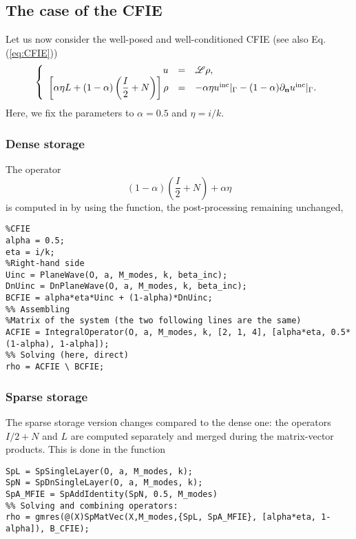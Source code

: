 \subsection{The case of the CFIE}

Let us now consider  the well-posed and well-conditioned CFIE (see also Eq. (\ref{eq:CFIE}))
$$
\left\{\begin{array}{r c l}
u &=& {\mathscr L}\rho,\\
\displaystyle \left[\alpha\eta L  + (1-\alpha)\left(\frac{I}{2}+N\right)\right]\rho &=& -\alpha\eta u^{\textrm{inc}}|_{\Gamma} - (1-\alpha) \partial_{\mathbf{n}}u^{\textrm{inc}}|_{\Gamma}.
\end{array}\right.
$$
Here, we fix the parameters  to $\alpha=0.5$ and $\eta = i/k$. 

\subsubsection{Dense storage}

The operator $$(1-\alpha)\left(\frac{I}{2}+N\right) + \alpha\eta$$ is computed in \mudiff by
using the \IntegralOperator function,  the post-processing remaining  unchanged,
\begin{lstlisting}
%CFIE
alpha = 0.5;
eta = i/k;
%Right-hand side
Uinc = PlaneWave(O, a, M_modes, k, beta_inc);
DnUinc = DnPlaneWave(O, a, M_modes, k, beta_inc);
BCFIE = alpha*eta*Uinc + (1-alpha)*DnUinc;
%% Assembling
%Matrix of the system (the two following lines are the same)
ACFIE = IntegralOperator(O, a, M_modes, k, [2, 1, 4], [alpha*eta, 0.5*(1-alpha), 1-alpha]);
%% Solving (here, direct)
rho = ACFIE \ BCFIE;
\end{lstlisting}
\medskip

\subsubsection{Sparse storage}

The sparse storage version changes compared to the dense one: the operators $I/2 + N$ and $L$ are computed separately and merged during the matrix-vector products. This is done in the \SpMatVec function
\begin{lstlisting}
SpL = SpSingleLayer(O, a, M_modes, k);
SpN = SpDnSingleLayer(O, a, M_modes, k);
SpA_MFIE = SpAddIdentity(SpN, 0.5, M_modes)
%% Solving and combining operators:
rho = gmres(@(X)SpMatVec(X,M_modes,{SpL, SpA_MFIE}, [alpha*eta, 1-alpha]), B_CFIE);
\end{lstlisting}
\medskip

